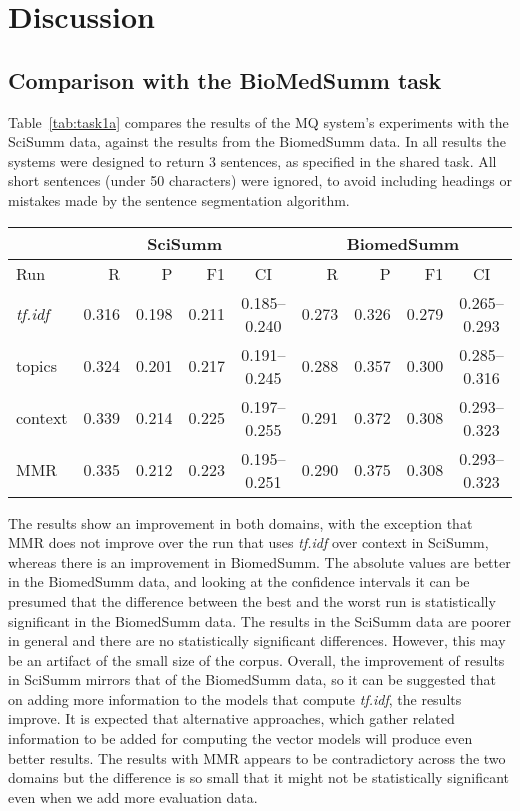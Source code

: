 \documentclass[11pt]{article}
\begin{document}
\section{Discussion}
\subsection{Comparison with the BioMedSumm task}
Table~\ref{tab:task1a} compares the results of the MQ system's experiments with 
the SciSumm data, against the results from the BiomedSumm data. In all results 
the systems were designed to return 3 sentences, as specified in the shared task. 
All short sentences (under 50 characters) were ignored, to avoid including headings 
or mistakes made by the sentence segmentation algorithm.

\begin{table*}
  \centering
  \begin{tabular}{|l|r|r|r|c|r|r|r|c|}
  	\hline
	& \multicolumn{4}{|c|}{SciSumm} & \multicolumn{4}{|c|}{BiomedSumm}\\
	\hline
	Run & R & P & F1 & CI & R & P & F1 & CI\\
	\hline
    \emph{tf.idf} & 0.316 & 0.198 & 0.211 & 0.185--0.240 & 0.273 &
    0.326 & 0.279 & 0.265--0.293\\
	topics & 0.324 & 0.201 & 0.217 & 0.191--0.245 & 0.288 & 0.357 & 0.300
	& 0.285--0.316\\
	context & 0.339 & 0.214 & 0.225 & 0.197--0.255 & 0.291 & 0.372 & 0.308
	& 0.293--0.323\\
	MMR & 0.335 & 0.212 & 0.223 & 0.195--0.251 &  0.290 & 0.375 & 0.308 & 0.293--0.323\\ 
	\hline
  \end{tabular}
  \caption{ROUGE-L results of the MQ system runs for task 1a}
  \label{tab:task1a}
\end{table*}

The results show an improvement in both domains, with the exception that MMR 
does not improve over the run that uses \emph{tf.idf} over context in SciSumm, 
whereas there is an improvement in BiomedSumm. The absolute values are better 
in the BiomedSumm data, and looking at the confidence intervals it can be 
presumed that the difference between the best and the worst run is 
statistically significant in the BiomedSumm data. The results in the SciSumm 
data are poorer in general and there are no statistically significant 
differences. However, this may be an artifact of the small size of the corpus. 
Overall, the improvement of results in SciSumm mirrors that of the BiomedSumm 
data, so it can be suggested that on adding more information to the models that 
compute \emph{tf.idf}, the results improve. It is expected that alternative 
approaches, which gather related information to be added for computing the 
vector models will produce even better results. The results with MMR appears 
to be contradictory across the two domains but the difference is so small that 
it might not be statistically significant even when we add more evaluation data.
\end{document}
